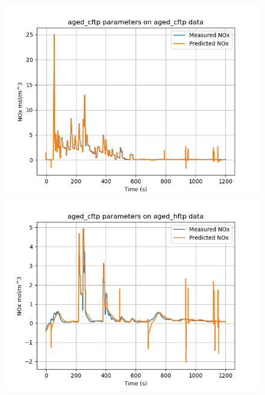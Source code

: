 \begin{figure}[H]
        \begin{minipage}{0.3\textwidth}
                \includegraphics[width = \textwidth]{./figs/figs_new_mdl/aged_cftp_aged_cftp.png}
        \end{minipage}
        \begin{minipage}{0.3\textwidth}
                \includegraphics[width = \textwidth]{./figs/figs_new_mdl/aged_cftp_aged_hftp.png}
        \end{minipage}
        \begin{minipage}{0.3\textwidth}

\end{minipage}
\end{figure}
